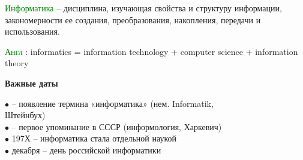 \newpage
\rhead{\textbf{\textcolor{blue}{Т}\textcolor{gray}{ерминология: Информация и данные}}}
\vspace*{4mm}

\textcolor{Green}{Информатика}
– дисциплина, изучающая свойства и структуру информации,
закономерности ее создания, преобразования, накопления, передачи и
использования.

\vspace*{2mm}
\textcolor{Green}{Англ}
: informatics = information technology + computer science + information
theory

\vspace*{5mm}
\begin{center}
\textbf{Важные даты}
\end{center}
$\bullet$   – появление термина «информатика» (нем. Informatik, \\
\qquad Штейнбух) \\
$\bullet$   – первое упоминание в СССР (информология, Харкевич) \\
$\bullet$  \quad 197Х – информатика стала отдельной наукой \\
$\bullet$   декабря – день российской информатики


